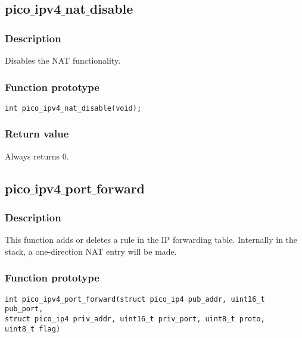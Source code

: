 \subsection{pico$\_$ipv4$\_$nat$\_$disable}

\subsubsection*{Description}
Disables the NAT functionality.

\subsubsection*{Function prototype}
\begin{verbatim}
int pico_ipv4_nat_disable(void);
\end{verbatim}


\subsubsection*{Return value}
Always returns 0.



\subsection{pico$\_$ipv4$\_$port$\_$forward}

\subsubsection*{Description}
This function adds or deletes a rule in the IP forwarding table. Internally in the stack,
a one-direction NAT entry will be made.

\subsubsection*{Function prototype}
\begin{verbatim}
int pico_ipv4_port_forward(struct pico_ip4 pub_addr, uint16_t pub_port,
struct pico_ip4 priv_addr, uint16_t priv_port, uint8_t proto,
uint8_t flag)
\end{verbatim}


